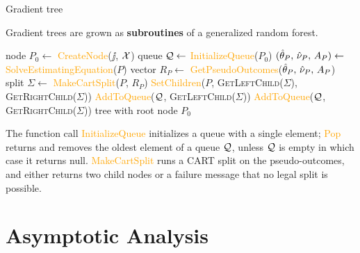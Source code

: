 \documentclass[aos]{imsart}
\theoremstyle{plain}
\theoremstyle{definition}
\theoremstyle{remark}
\begin{document}
\begin{CJK}{UTF8}{gbsn}
\begin{algorithm}[t]
\caption{Gradient tree}\label{alg:tree}
\vspace{-0.4\baselineskip}
\justify
Gradient trees are grown as \textbf{subroutines} of a generalized random forest.
\begin{algorithmic}[1]
\State node $P_0 \gets$ \textcolor{orange}{CreateNode}{($\jj$, $\mathcal{X}$)}
\State queue $\mathcal{Q} \gets$ \textcolor{orange}{InitializeQueue}{($P_0$)}
\State $(\hat{\theta}_P, \, \hat{\nu}_P, \, A_P) \gets$ \textcolor{orange}{SolveEstimatingEquation}{($P$)}
\State vector $R_P \gets$ \textcolor{orange}{GetPseudoOutcomes}{($\hat{\theta}_P, \, \hat{\nu}_P, \, A_P$)}
\State split $\Sigma \gets$ \textcolor{orange}{MakeCartSplit}{($P$, $R_P$)}
\If{\textcolor{orange}{SplitSucceeded}{($\Sigma$)}}
\State \textcolor{orange}{SetChildren}{($P$, \textsc{GetLeftChild}($\Sigma$), \textsc{GetRightChild}($\Sigma$))}
\State \textcolor{orange}{AddToQueue}{($\mathcal{Q}$, \textsc{GetLeftChild}($\Sigma$))}
\State \textcolor{orange}{AddToQueue}{($\mathcal{Q}$, \textsc{GetRightChild}($\Sigma$))}
\EndIf
\EndWhile
{} tree with root node $P_0$
\EndProcedure
\end{algorithmic}
\justify
The function call \textcolor{orange}{InitializeQueue} initializes a queue with a single element;
\textcolor{orange}{Pop} returns and removes the oldest element of a queue $\mathcal{Q}$,
unless $\mathcal{Q}$ is empty in which case it returns null. \textcolor{orange}{MakeCartSplit} runs a CART split
on the pseudo-outcomes, and either returns two child nodes or a failure message that no legal
split is possible.
\end{algorithm}





\newpage


\section{Asymptotic Analysis}
\label{sec:theory}



\end{CJK}
\end{document}
